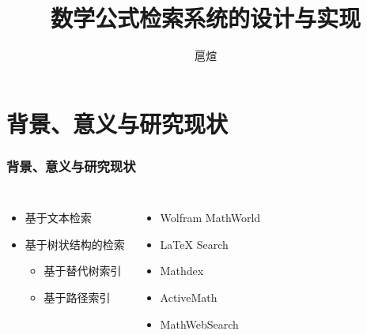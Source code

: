 

\title{数学公式检索系统的设计与实现}
\author{扈\quad 煊}


\CTEXnoindent

    

    \section{背景、意义与研究现状}
    
    \begin{frame}
        \frametitle{背景、意义与研究现状}
        \begin{columns}
            \pause

            \begin{itemize}
                \item 基于文本检索
                \item 基于树状结构的检索
                \begin{itemize}
                    \item 基于替代树索引
                    \item 基于路径索引
                \end{itemize}
            \end{itemize}

            \pause

            \begin{itemize}
                \item Wolfram MathWorld
                \item LaTeX Search
                \item Mathdex
                \item ActiveMath
                \item MathWebSearch
            \end{itemize}

        \end{columns}
    \end{frame}
    
